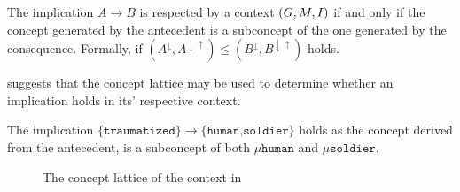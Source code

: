 \begin{proposition}
	\label{proposition:implication-concepts}

	The implication $A \rightarrow B$ is respected by a context $(G,M,\mathrel{I})$ if and only
	if the concept generated by the antecedent is a subconcept of the one
	generated by the consequence. Formally, if
	$(A^{\downarrow}, A^{\downarrow \uparrow}) \leq (B^{\downarrow}, B^{\downarrow
			\uparrow})$
	holds.
\end{proposition}

 suggests that the concept lattice may be
used to determine whether an implication holds in its' respective context.

\begin{example}
	The implication $\{\texttt{traumatized}\}\rightarrow \{\texttt{human,soldier}\}$
	holds as the concept derived from the antecedent, is a subconcept of both
	$\mu \texttt{human}$ and $\mu \texttt{soldier}$.

	\begin{figure}[H]
		\centering
		{\unitlength 1.75mm

			\begin{diagram}{40}{50} %

				 

				 

				 

				 

				  

				 

				 

				  


				  

				   

				 

				     \end{diagram} }
		\caption{The concept lattice of the context in
			}
	\end{figure}
\end{example}

